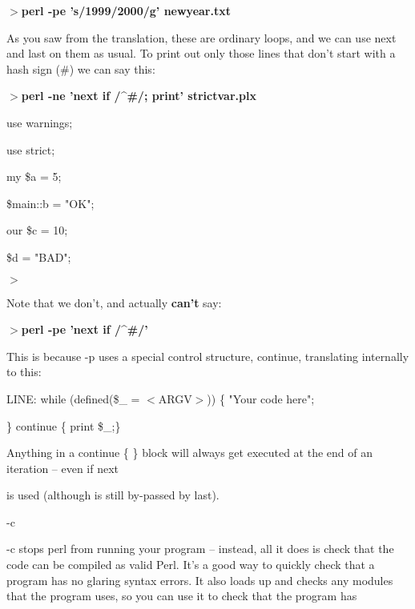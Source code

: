\documentclass[a4paper,11pt]{book}
\begin{document}
\noindent $>$\textbf{perl -pe 's/1999/2000/g' newyear.txt}

\noindent 

\noindent As you saw from the translation, these are ordinary loops, and we can use next and last on them as usual. To print out only those lines that don't start with a hash sign (\#) we can say this:

\noindent 

\noindent 

\noindent $>$\textbf{perl -ne 'next if /\^{}\#/; print' strictvar.plx}

\noindent use warnings;

\noindent use strict;

\noindent 

\noindent my \$a = 5;

\noindent \$main::b = "OK";

\noindent our \$c = 10;

\noindent \$d = "BAD";

\noindent $>$

\noindent 

\noindent Note that we don't, and actually \textbf{can't }say:

\noindent 

\noindent $>$\textbf{perl -pe 'next if /\^{}\#/'}

\noindent 

\noindent This is because -p uses a special control structure, continue, translating internally to this:

\noindent 

\noindent LINE: while (defined(\$\_  = $<$ARGV$>$)) \{ "Your code here";

\noindent \} continue \{ print \$\_;\}

\noindent 

\noindent Anything in a continue \{ \} block will always get executed at the end of an iteration -- even if next

\noindent is used (although is still by-passed by last).

\noindent 

\noindent 

\noindent -c

\noindent 

\noindent -c stops perl from running your program -- instead, all it does is check that the code can be compiled as valid Perl. It's a good way to quickly check that a program has no glaring syntax errors. It also loads up and checks any modules that the program uses, so you can use it to check that the program has
\end{document}
